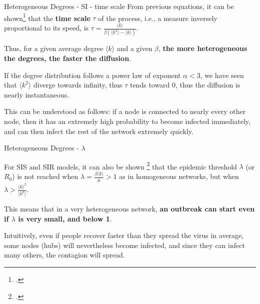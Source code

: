 \begin{textbox}{Heterogeneous Degrees - SI - time scale}
    From previous equations, it can be shown\footcite{barrat2008dynamical} that the \textbf{time scale} $\tau$ of the process, i.e., a measure inversely proportional to its speed, is $\tau=\frac{\langle k \rangle}{\beta(\langle k^2 \rangle - \langle k \rangle)}$.

    Thus, for a given average degree $\langle k \rangle$ and a given $\beta$, \textbf{the more heterogeneous the degrees, the faster the diffusion}.

    If the degree distribution follows a power law of exponent $\alpha<3$, we have seen that $\langle k^2 \rangle$ diverge towards infinity, thus $\tau$ tends toward 0, thus the diffusion is nearly instantaneous.

    This can be understood as follows: if a node is connected to nearly every other node, then it has an extremely high probability to become infected immediately, and can then infect the rest of the network extremely quickly.
\end{textbox}


\begin{textbox}{Heterogeneous Degrees - $\lambda$}

    For SIS and SIR models, it can also be shown \footcite{barrat2008dynamical} that the epidemic threshold $\lambda$ (or $R_0$) is not reached when $\lambda=\frac{\beta\langle k \rangle}{\mu}>1$ as in homogeneous networks, but when $\lambda >\frac{\langle k \rangle^2}{\langle k^2 \rangle}$.

    This means that in a very heterogeneous network, \textbf{an outbreak can start even if $\lambda$ is very small, and below 1}.

    Intuitively, even if people recover faster than they spread the virus in average, some nodes (hubs) will nevertheless become infected, and since they can infect many others, the contagion will spread.

\end{textbox}


